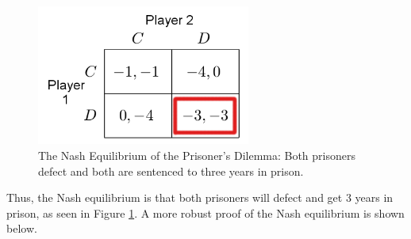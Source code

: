\begin{figure}[H]
  \centering
  \includegraphics[width=7cm]{figures/ExampleNashEquilibrium.png}
  \caption{The Nash Equilibrium of the Prisoner's Dilemma: Both prisoners defect and both are sentenced to three years in prison.}
  \label{fig:NashEquil}
\end{figure}

Thus, the Nash equilibrium is that both prisoners will defect and get 3 years in prison, as seen in Figure \ref{fig:NashEquil}. A more robust proof of the Nash equilibrium is shown below.

